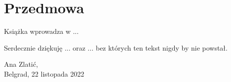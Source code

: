 

\chapter*{Przedmowa}
Książka wprowadza w ...

Serdecznie dziękuję ... oraz ... bez których ten tekst nigdy by nie powstał.\\${}$

\begin{flushright}
Ana Zlatić,\\Belgrad, 22 listopada 2022
\end{flushright}



